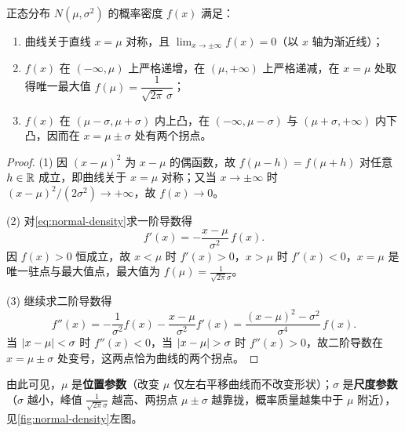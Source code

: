 \begin{proposition}[正态密度曲线的几何特征]
\label{prop:normal-density-shape}
正态分布 $N(\mu,\sigma^2)$ 的概率密度 $f(x)$ 满足：
\begin{enumerate}
  \item 曲线关于直线 $x=\mu$ 对称，且 $\lim_{x\to\pm\infty}f(x)=0$（以 $x$ 轴为渐近线）；
  \item $f(x)$ 在 $(-\infty,\mu)$ 上严格递增，在 $(\mu,+\infty)$ 上严格递减，在 $x=\mu$ 处取得唯一最大值 $f(\mu)=\dfrac{1}{\sqrt{2\pi}\,\sigma}$；
  \item $f(x)$ 在 $(\mu-\sigma,\mu+\sigma)$ 内上凸，在 $(-\infty,\mu-\sigma)$ 与 $(\mu+\sigma,+\infty)$ 内下凸，因而在 $x=\mu\pm\sigma$ 处有两个拐点。
\end{enumerate}
\end{proposition}
\begin{proof}
(1) 因 $(x-\mu)^2$ 为 $x-\mu$ 的偶函数，故 $f(\mu-h)=f(\mu+h)$ 对任意 $h\in\mathbb{R}$ 成立，即曲线关于 $x=\mu$ 对称；又当 $x\to\pm\infty$ 时 $(x-\mu)^2/(2\sigma^2)\to+\infty$，故 $f(x)\to 0$。

(2) 对\eqref{eq:normal-density}求一阶导数得
\[
  f'(x)=-\frac{x-\mu}{\sigma^2}\,f(x).
\]
因 $f(x)>0$ 恒成立，故 $x<\mu$ 时 $f'(x)>0$，$x>\mu$ 时 $f'(x)<0$，$x=\mu$ 是唯一驻点与最大值点，最大值为 $f(\mu)=\frac{1}{\sqrt{2\pi}\sigma}$。

(3) 继续求二阶导数得
\[
  f''(x)=-\frac{1}{\sigma^2}f(x)-\frac{x-\mu}{\sigma^2}f'(x)
  =\frac{(x-\mu)^2-\sigma^2}{\sigma^4}\,f(x).
\]
当 $\lvert x-\mu\rvert<\sigma$ 时 $f''(x)<0$，当 $\lvert x-\mu\rvert>\sigma$ 时 $f''(x)>0$，故二阶导数在 $x=\mu\pm\sigma$ 处变号，这两点恰为曲线的两个拐点。
\end{proof}

由此可见，$\mu$ 是\textbf{位置参数}（改变 $\mu$ 仅左右平移曲线而不改变形状）；$\sigma$ 是\textbf{尺度参数}（$\sigma$ 越小，峰值 $\frac{1}{\sqrt{2\pi}\sigma}$ 越高、两拐点 $\mu\pm\sigma$ 越靠拢，概率质量越集中于 $\mu$ 附近），见\cref{fig:normal-density}左图。


